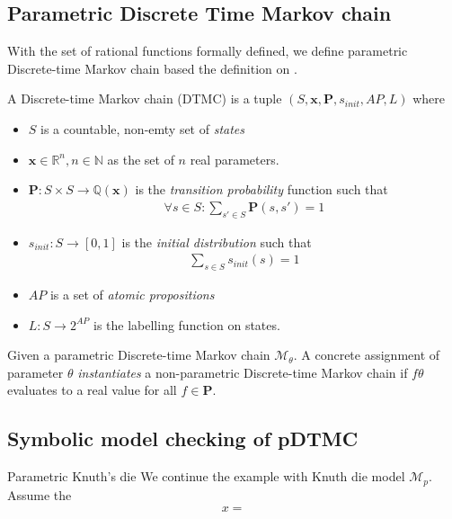 \subsection{Parametric Discrete Time Markov chain}
With the set of rational functions formally defined, we define parametric Discrete-time Markov chain
based the definition on \cite{junges2019parameter}.
\begin{definition}
    A Discrete-time Markov chain (DTMC) is a tuple $(S, \mathbf{x}, \mathbf{P}, s_{init}, AP, L)$
    where
    \begin{itemize}
        \item $S$ is a countable, non-emty set of \textit{states}
        \item $\mathbf{x} \in \mathbb{R}^n, n \in \mathbb{N}$ as the set of $n$ real parameters.
        \item $\mathbf{P}:S\times S \rightarrow \mathbb{Q}(\mathbf{x})$ is the \textit{transition
                  probability} function such that
              \begin{align*}
                  \forall s \in S : \sum_{s'\in S}\mathbf{P}(s, s') = 1
              \end{align*}
        \item $s_{init}: S \rightarrow [0,1]$ is the \textit{initial distribution} such that
              \begin{align*}
                  \sum_{s\in S}s_{init}(s) = 1
              \end{align*}
        \item $AP$ is a set of \textit{atomic propositions}
        \item $L: S \rightarrow 2^{AP}$ is the labelling function on states.
    \end{itemize}
\end{definition}

Given a parametric Discrete-time Markov chain $\mathcal{M}_\theta$. A concrete assignment of parameter $\theta$
\textit{instantiates} a non-parametric Discrete-time Markov chain if $f{\theta}$ evaluates to a
real value for all $f\in\mathbf{P}$.

\subsection{Symbolic model checking of pDTMC}

\begin{example}{Parametric Knuth's die}
    We continue the example with Knuth die model $\mathcal{M}_{p}$. Assume the
    \begin{align*}
        x =
    \end{align*}
\end{example}

